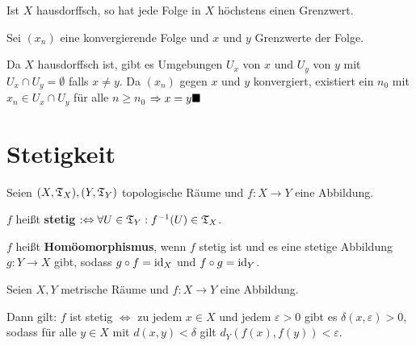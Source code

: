 \begin{bemerkung}
    Ist $X$ hausdorffsch, so hat jede Folge in $X$ höchstens einen
    Grenzwert.
\end{bemerkung}

\begin{beweis}
    Sei $(x_n)$ eine konvergierende Folge und $x$ und $y$ Grenzwerte der Folge.

    Da $X$ hausdorffsch ist, gibt es Umgebungen $U_x$ von $x$ und $U_y$
    von $y$ mit $U_x \cap U_y = \emptyset$ falls $x \neq y$. Da 
    $(x_n)$ gegen $x$ und $y$ konvergiert, existiert ein
    $n_0$ mit $x_n \in U_x \cap U_y$ für alle $n \geq n_0$
    $\Rightarrow x = y \qed$
\end{beweis}

\section{Stetigkeit}
\begin{definition}
    Seien $(X, \mathfrak{T}_X), (Y, \mathfrak{T}_Y)$ topologische Räume und 
    $f:X \rightarrow Y$ eine Abbildung.

    \begin{defenum}
        \item \label{def:stetigkeit} $f$ heißt \textbf{stetig}
              $:\Leftrightarrow \forall U \in \mathfrak{T}_Y: f^{-1} (U) \in \mathfrak{T}_X$.
        \item \label{def:homoeomorphismus} $f$ heißt \textbf{Homöomorphismus}, wenn $f$ stetig ist
              und es eine 
              stetige Abbildung  $g: Y \rightarrow X$ gibt, sodass
              $g \circ f = \textnormal{id}_X$ und $f \circ g = \textnormal{id}_Y$.
    \end{defenum}
\end{definition}

\begingroup
\renewcommand{\thmfoot}{\footnotemark}
\begin{bemerkung}
  Seien $X, Y$ metrische Räume und $f\colon X \rightarrow Y$ eine
  Abbildung.

  Dann gilt: $f$ ist stetig $\Leftrightarrow$ zu jedem $x \in X$ und
  jedem $\varepsilon > 0$ gibt es $\delta(x, \varepsilon) > 0$, sodass
  für alle $y \in X$ mit $d(x,y) < \delta $ gilt $d_Y(f(x), f(y)) <
  \varepsilon$.
\end{bemerkung}
\endgroup

